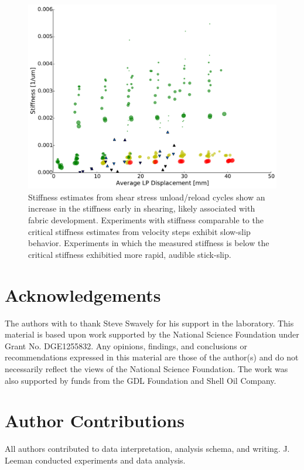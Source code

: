 \documentclass[11pt]{article}
\begin{document}
\begin{figure}
	\centering
		\includegraphics[scale=0.4]{../Figures/Fig_Stiffness_Evolution/Stiffness_Evolution.pdf}
   	\caption{Stiffness estimates from shear stress unload/reload cycles show
       an increase in the stiffness early in shearing, likely associated with
       fabric development. Experiments with stiffness comparable to the critical stiffness
       estimates from velocity steps exhibit slow-slip behavior. Experiments in
       which the measured stiffness is below the critical stiffness exhibitied
       more rapid, audible stick-slip.}
  	\label{Figure:Stiffness Evolution}
\end{figure}



\section{Acknowledgements}
The authors with to thank Steve Swavely for his support in the laboratory. This
material is based upon work supported by the National Science Foundation under
Grant No. DGE1255832.  Any opinions, findings, and conclusions or
recommendations expressed in this material are those of the author(s) and do not
necessarily reflect the views of the National Science Foundation. The work was
also supported by funds from the GDL Foundation and Shell Oil Company.

\section{Author Contributions}
All authors contributed to data interpretation, analysis schema, and writing.
J. Leeman conducted experiments and data analysis.
\end{document}
